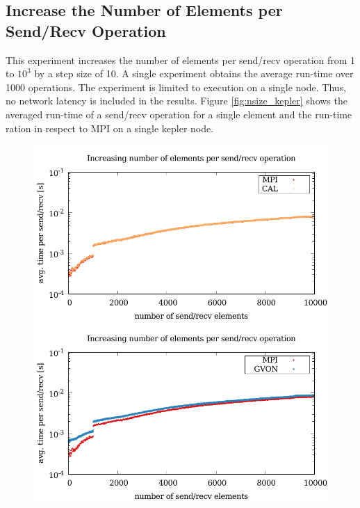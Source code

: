 \subsection*{Increase the Number of Elements per Send/Recv Operation}
This experiment increases the number of elements per send/recv
operation from 1 to $10^3$ by a step size of 10. A single experiment
obtains the average run-time over 1000 operations.  The experiment is
limited to execution on a single node. Thus, no network latency is
included in the results. Figure \ref{fig:nsize_kepler} shows the
averaged run-time of a send/recv operation for a single element and
the run-time ration in respect to MPI on a single kepler node.

\begin{figure}[H]
  \begin{minipage}[t]{0.5\textwidth}
    \includegraphics[width=\textwidth]{plots/50_nsize_cal_kepler}
    \includegraphics[width=\textwidth]{plots/50_nsize_gvon_kepler}

\end{minipage}
\end{figure}
